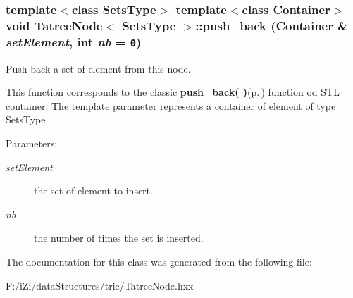 \subsubsection{\setlength{\rightskip}{0pt plus 5cm}template$<$class Sets\-Type$>$ template$<$class Container$>$ void {\bf Tatree\-Node}$<$ Sets\-Type $>$::push\_\-back (Container \& {\em set\-Element}, int {\em nb} = {\tt 0})\hspace{0.3cm}{\tt  [inline]}}\label{class_tatree_node_b8ab38f4a513579212225b8a5bf647f9}


Push back a set of element from this node. 

This function corresponds to the classic {\bf push\_\-back( )}{\rm (p.\,\pageref{class_tatree_node_b8ab38f4a513579212225b8a5bf647f9})} function od STL container. The template parameter represents a container of element of type Sets\-Type. \begin{Desc}
\item[Parameters:]
\begin{description}
\item[{\em set\-Element}]the set of element to insert. \item[{\em nb}]the number of times the set is inserted. \end{description}
\end{Desc}


The documentation for this class was generated from the following file:\begin{CompactItemize}
\item 
F:/i\-Zi/data\-Structures/trie/Tatree\-Node.hxx\end{CompactItemize}
